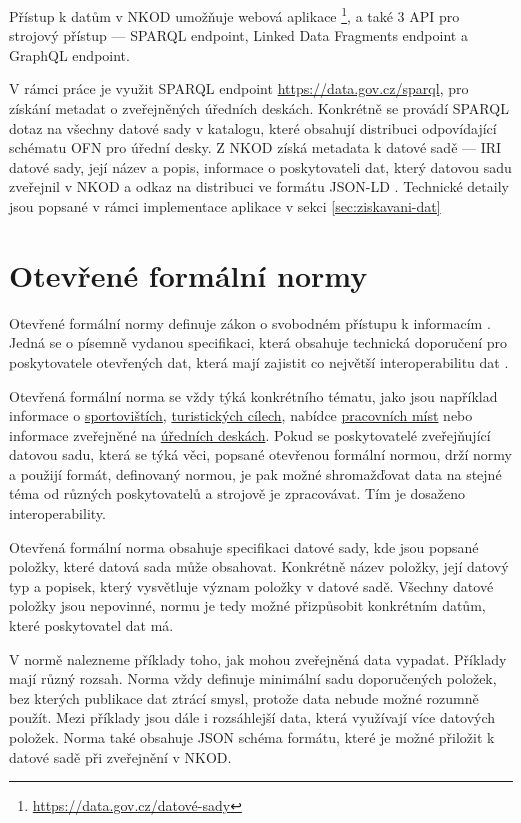Přístup k datům v NKOD umožňuje webová aplikace \footnote{\url{https://data.gov.cz/datové-sady}}, a také 3 API pro strojový přístup --- SPARQL \cite{SPARQL} endpoint, Linked Data Fragments \cite{LinkedData} endpoint a GraphQL \cite{Graphql} endpoint. 

V rámci práce je využit SPARQL endpoint \url{https://data.gov.cz/sparql}, pro získání metadat o zveřejněných úředních deskách. Konkrétně se provádí SPARQL dotaz na všechny datové sady v katalogu, které obsahují distribuci odpovídající schématu OFN pro úřední desky. Z NKOD získá metadata k datové sadě --- IRI datové sady, její název a popis, informace o poskytovateli dat, který datovou sadu zveřejnil v NKOD a odkaz na distribuci ve formátu JSON-LD \cite{JSON-LD}. Technické detaily jsou popsané v rámci implementace aplikace v sekci \ref{sec:ziskavani-dat}


\section{Otevřené formální normy}\label{sec:ofn}

Otevřené formální normy definuje zákon o svobodném přístupu k informacím \cite{ZakonSvobodny3}. Jedná se o písemně vydanou specifikaci, která obsahuje technická doporučení pro poskytovatele otevřených dat, která mají zajistit co největší interoperabilitu dat \cite{OFN}.

Otevřená formální norma se vždy týká konkrétního tématu, jako jsou například informace o \href{https://ofn.gov.cz/sportoviště/2020-07-01/}{sportovištích}, \href{https://ofn.gov.cz/turistické-cíle/2020-07-01/}{turistických cílech}, nabídce \href{https://ofn.gov.cz/pracovní-místa/2021-09-23/}{pracovních míst} nebo informace zveřejněné na \href{https://ofn.gov.cz/úřední-desky/2021-07-20/}{úředních deskách}. Pokud se poskytovatelé zveřejňující datovou sadu, která se týká věci, popsané otevřenou formální normou, drží normy a použijí formát, definovaný normou, je pak možné shromažďovat data na stejné téma od různých poskytovatelů a strojově je zpracovávat. Tím je dosaženo interoperability.

Otevřená formální norma obsahuje specifikaci datové sady, kde jsou popsané položky, které datová sada může obsahovat. Konkrétně název položky, její datový typ a popisek, který vysvětluje význam položky v datové sadě. Všechny datové položky jsou nepovinné, normu je tedy možné přizpůsobit konkrétním datům, které poskytovatel dat má. 

V normě nalezneme příklady toho, jak mohou zveřejněná data vypadat. Příklady mají různý rozsah. Norma vždy definuje minimální sadu doporučených položek, bez kterých publikace dat ztrácí smysl, protože data nebude možné rozumně použít. Mezi příklady jsou dále i rozsáhlejší data, která využívají více datových položek. Norma také obsahuje JSON schéma formátu, které je možné přiložit k datové sadě při zveřejnění v NKOD.


